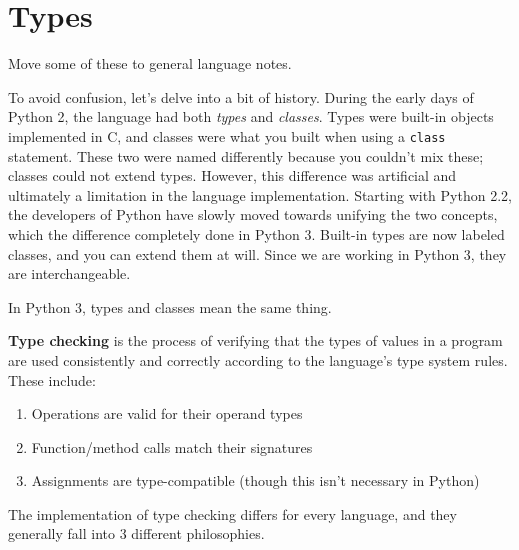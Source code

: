 \section{Types} 

  \begin{question}[To Do]
    Move some of these to general language notes. 
  \end{question}

  To avoid confusion, let's delve into a bit of history. During the early days of Python 2, the language had both \textit{types} and \textit{classes}. Types were built-in objects implemented in C, and classes were what you built when using a \texttt{class} statement. These two were named differently because you couldn't mix these; classes could not extend types. However, this difference was artificial and ultimately a limitation in the language implementation. Starting with Python 2.2, the developers of Python have slowly moved towards unifying the two concepts, which the difference completely done in Python 3. Built-in types are now labeled classes, and you can extend them at will. Since we are working in Python 3, they are interchangeable.  

  \begin{theorem}
    In Python 3, types and classes mean the same thing. 
  \end{theorem} 

  \begin{definition}
    \textbf{Type checking} is the process of verifying that the types of values in a program are used consistently and correctly according to the language's type system rules. These include: 
    \begin{enumerate}
      \item Operations are valid for their operand types 
      \item Function/method calls match their signatures 
      \item Assignments are type-compatible (though this isn't necessary in Python) 
    \end{enumerate}
  \end{definition}

  The implementation of type checking differs for every language, and they generally fall into 3 different philosophies. 

